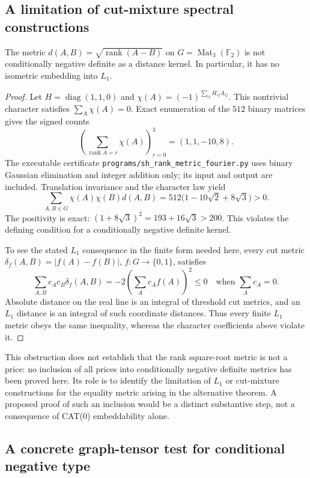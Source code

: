 \subsection{A limitation of cut-mixture spectral constructions}

\begin{proposition}
\label{prop:rank-not-lone}
The metric
$d(A,B)=\sqrt{\operatorname{rank}(A-B)}$ on
$G=\operatorname{Mat}_3(\mathbb F_2)$ is not conditionally negative
definite as a distance kernel.  In particular, it has no isometric
embedding into $L_1$.
\end{proposition}
\begin{proof}
Let $H=\operatorname{diag}(1,1,0)$ and
$\chi(A)=(-1)^{\sum_{ij}H_{ij}A_{ij}}$.  This nontrivial character
satisfies $\sum_A\chi(A)=0$.  Exact enumeration of the $512$ binary
matrices gives the signed counts
\[
 \left(\sum_{\operatorname{rank}A=r}\chi(A)\right)_{r=0}^3
 =(1,1,-10,8).
\]
The executable certificate
\texttt{programs/sh\_rank\_metric\_fourier.py} uses binary Gaussian
elimination and integer addition only; its input and output are
included.  Translation invariance and the character law yield
\[
 \sum_{A,B\in G}\chi(A)\chi(B)d(A,B)
 =512\bigl(1-10\sqrt2+8\sqrt3\bigr)>0.
\]
The positivity is exact: $(1+8\sqrt3)^2=193+16\sqrt3>200$.
This violates the defining condition for a conditionally negative
definite kernel.

To see the stated $L_1$ consequence in the finite form needed here,
every cut metric $\delta_f(A,B)=|f(A)-f(B)|$, $f:G\to\{0,1\}$,
satisfies
\[
 \sum_{A,B}c_Ac_B\delta_f(A,B)
 =-2\left(\sum_Ac_Af(A)\right)^2\le0
 \quad\text{when }\sum_Ac_A=0.
\]
Absolute distance on the real line is an integral of threshold cut
metrics, and an $L_1$ distance is an integral of such coordinate
distances.  Thus every finite $L_1$ metric obeys the same inequality,
whereas the character coefficients above violate it.
\end{proof}

This obstruction does not establish that the rank square-root metric
is not a price: no inclusion of all prices into conditionally negative
definite metrics has been proved here.  Its role is to identify the
limitation of $L_1$ or cut-mixture constructions for the equality metric
arising in the alternative theorem.  A proposed proof of such an
inclusion would be a distinct substantive step, not a consequence of
CAT(0) embeddability alone.

\subsection{A concrete graph-tensor test for conditional negative type}

